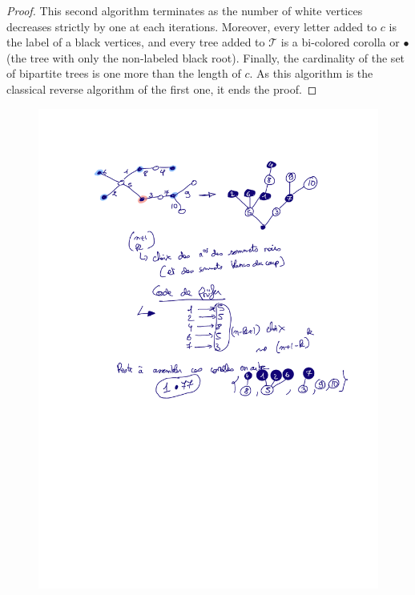 \begin{proof}
This second algorithm terminates as the number of white vertices decreases strictly by one at each iterations. Moreover, every letter added to $c$ is the label of a black vertices, and every tree added to $\mathcal{T}$ is a bi-colored corolla or $\bullet$ (the tree with only the non-labeled black root). Finally, the cardinality of the set of bipartite trees is one more than the length of $c$. As this algorithm is the classical reverse algorithm of the first one, it ends the proof.
\end{proof}

\begin{example}
\begin{figure}[!h]
\includegraphics[scale=0.5]{Images/ExplePrufer.pdf}
\end{figure}
\end{example}

